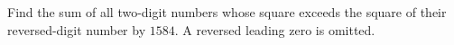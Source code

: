 Find the sum of all two-digit numbers whose square exceeds the square of their reversed-digit number by $1584$. A reversed leading zero is omitted.

